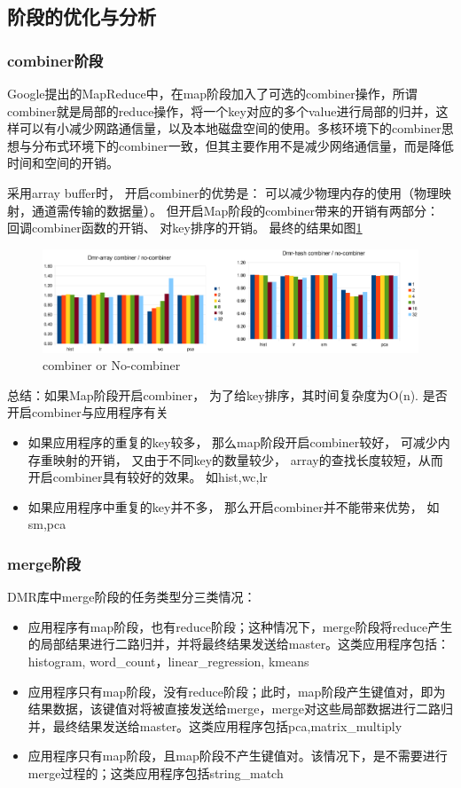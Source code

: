 \subsection{阶段的优化与分析}
\subsubsection{combiner阶段}
Google提出的MapReduce中，在map阶段加入了可选的combiner操作，所谓combiner就是局部的reduce操作，将一个key对应的多个value进行局部的归并，这样可以有小减少网路通信量，以及本地磁盘空间的使用。多核环境下的combiner思想与分布式环境下的combiner一致，但其主要作用不是减少网络通信量，而是降低时间和空间的开销。

采用array buffer时，
开启combiner的优势是：
可以减少物理内存的使用（物理映射，通道需传输的数据量）。
但开启Map阶段的combiner带来的开销有两部分：
回调combiner函数的开销、
对key排序的开销。
最终的结果如图\ref{dmr:combiner}
\begin{figure}[!h!t]  
    \centering
    \includegraphics[width=1\textwidth]{img/dmr_combiner.eps}
    \caption{combiner or No-combiner}
    \label{dmr:combiner}
\end{figure}

总结：如果Map阶段开启combiner，
为了给key排序，其时间复杂度为O(n).
是否开启combiner与应用程序有关
\begin{itemize}
  \item 如果应用程序的重复的key较多，
  那么map阶段开启combiner较好，
  可减少内存重映射的开销，
  又由于不同key的数量较少，
  array的查找长度较短，从而开启combiner具有较好的效果。
  如hist,wc,lr
  
  \item 如果应用程序中重复的key并不多，
  那么开启combiner并不能带来优势，
  如sm,pca
\end{itemize}



\subsubsection{merge阶段}
DMR库中merge阶段的任务类型分三类情况：
\begin{itemize}
  \item 应用程序有map阶段，也有reduce阶段；这种情况下，merge阶段将reduce产生的局部结果进行二路归并，并将最终结果发送给master。这类应用程序包括：histogram, word\_count，linear\_regression, kmeans
  \item 应用程序只有map阶段，没有reduce阶段；此时，map阶段产生键值对，即为结果数据，该键值对将被直接发送给merge，merge对这些局部数据进行二路归并，最终结果发送给master。这类应用程序包括pca,matrix\_multiply
  \item 应用程序只有map阶段，且map阶段不产生键值对。该情况下，是不需要进行merge过程的；这类应用程序包括string\_match
\end{itemize}

